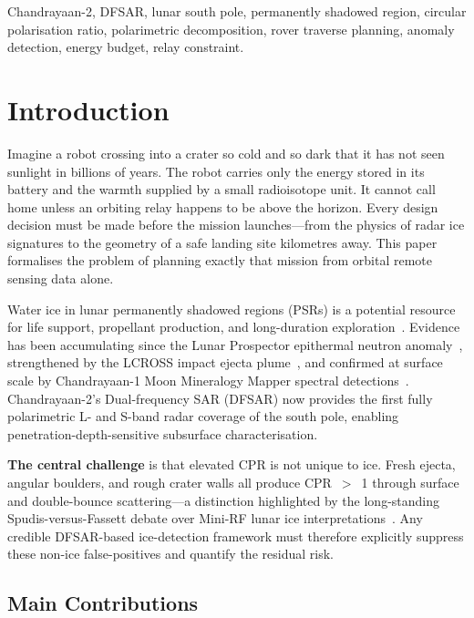 \documentclass[10pt,conference]{IEEEtran}
\begin{document}
\begin{IEEEkeywords}
Chandrayaan-2, DFSAR, lunar south pole, permanently shadowed region,
circular polarisation ratio, polarimetric decomposition, rover traverse
planning, anomaly detection, energy budget, relay constraint.
\end{IEEEkeywords}

\section{Introduction}
\label{sec:intro}

Imagine a robot crossing into a crater so cold and so dark that it
has not seen sunlight in billions of years.
The robot carries only the energy stored in its battery and the warmth
supplied by a small radioisotope unit.
It cannot call home unless an orbiting relay happens to be above the
horizon.
Every design decision must be made before the mission launches---from
the physics of radar ice signatures to the geometry of a safe landing
site kilometres away.
This paper formalises the problem of planning exactly that mission from
orbital remote sensing data alone.

Water ice in lunar permanently shadowed regions (PSRs) is a potential
resource for life support, propellant production, and long-duration
exploration~\cite{colaprete2010lcross,neumann2013floor}.
Evidence has been accumulating since the Lunar Prospector epithermal
neutron anomaly~\cite{feldman1998lpneutron}, strengthened by the
LCROSS impact ejecta plume~\cite{colaprete2010lcross}, and confirmed
at surface scale by Chandrayaan-1 Moon Mineralogy Mapper
spectral detections~\cite{pieters2009m3}.
Chandrayaan-2's Dual-frequency SAR (DFSAR) now provides the first
fully polarimetric L- and S-band radar coverage of the south pole,
enabling penetration-depth-sensitive subsurface characterisation.

\textbf{The central challenge} is that elevated CPR is not unique
to ice.
Fresh ejecta, angular boulders, and rough crater walls all produce
CPR~$>$~1 through surface and double-bounce scattering---a distinction
highlighted by the long-standing Spudis-versus-Fassett debate over
Mini-RF lunar ice interpretations~\cite{spudis2013mini,fassett2018}.
Any credible DFSAR-based ice-detection framework must therefore
explicitly suppress these non-ice false-positives and quantify the
residual risk.

\subsection*{Main Contributions}
\end{document}
